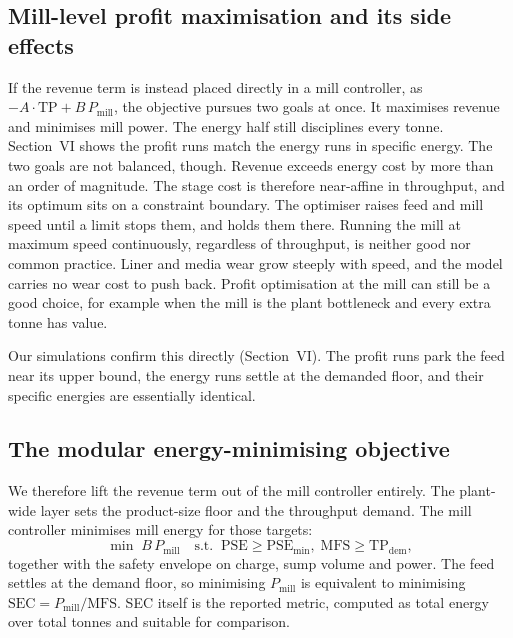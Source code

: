 \documentclass[conference]{IEEEtran}
\begin{document}
\subsection{Mill-level profit maximisation and its side effects}

If the revenue term is instead placed directly in a mill controller, as
$-A\cdot\mathrm{TP} + B\,P_{\mathrm{mill}}$, the objective pursues two
goals at once. It maximises revenue and minimises mill power. The energy
half still disciplines every tonne. Section~VI shows the profit runs match
the energy runs in specific energy. The two goals are not balanced,
though. Revenue exceeds energy cost by more than an order of magnitude. The
stage cost is therefore near-affine in throughput, and its optimum sits on
a constraint boundary. The optimiser raises feed and mill speed until a
limit stops them, and holds them there. Running the mill at maximum speed
continuously, regardless of throughput, is neither good nor common
practice. Liner and media wear grow steeply with speed, and the model
carries no wear cost to push back. Profit optimisation at the mill can
still be a good choice, for example when the mill is the plant bottleneck
and every extra tonne has value.

Our simulations confirm this directly (Section~VI). The profit runs park
the feed near its upper bound, the energy runs settle at the demanded
floor, and their specific energies are essentially identical.

\subsection{The modular energy-minimising objective}

We therefore lift the revenue term out of the mill controller entirely.
The plant-wide layer sets the product-size floor and the throughput
demand. The mill controller minimises mill energy for those targets:
\begin{equation}
\min \; B\,P_{\mathrm{mill}}
\quad \text{s.t.}\;\; \mathrm{PSE}\ge \mathrm{PSE}_{\min},\;
\mathrm{MFS}\ge \mathrm{TP}_{\mathrm{dem}},
\label{eq:sec}
\end{equation}
together with the safety envelope on charge, sump volume and power. The
feed settles at the demand floor, so minimising
$P_{\mathrm{mill}}$ is equivalent to minimising
$\mathrm{SEC}=P_{\mathrm{mill}}/\mathrm{MFS}$. SEC itself is the
reported metric, computed as total energy over total tonnes and suitable
for comparison.
\end{document}
